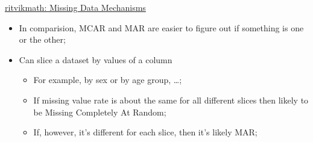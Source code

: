 \documentclass[12pt, titlepage, french]{report}
\begin{document}
\begin{YTB_SUMM_AUTO_NUMB}[label = {rvm-MCAR-etal}]{\href{https://www.youtube.com/watch?v=XnnA9z7lv4Q}{ritvikmath: Missing Data Mechanisms
}}
\begin{itemize}[leftmargin = *]
\begin{itemize}
		\end{itemize}
	\begin{itemize}
	\item	In comparision, MCAR and MAR are easier to figure out if something is one or the other;
	\item	Can slice a dataset by values of a column
		\begin{itemize}
		\item	For example, by sex or by age group, \dots;
		\item	If missing value rate is about the same for all different slices then likely to be Missing Completely At Random;
		\item	If, however, it's different for each slice, then it's likely MAR;
		\end{itemize}
	\end{itemize}
\end{itemize}
\end{YTB_SUMM_AUTO_NUMB}
\end{document}
